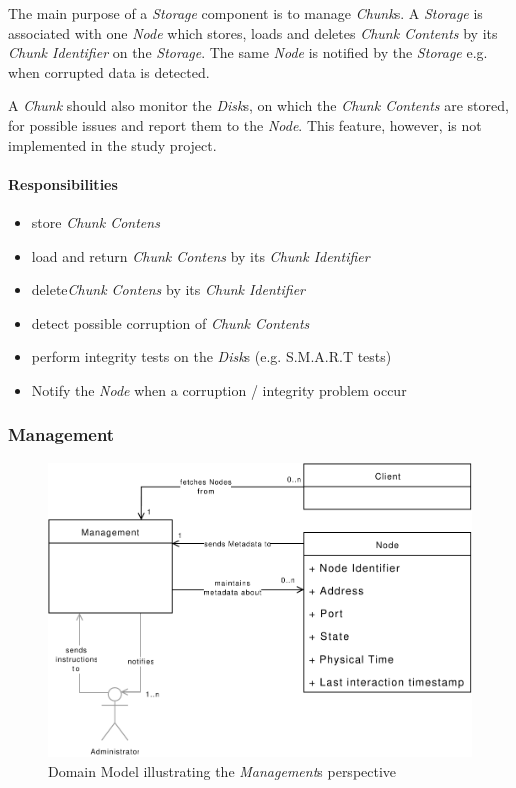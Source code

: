 The main purpose of a \emph{Storage} component is to manage \emph{Chunk}s.
A \emph{Storage} is associated with one \emph{Node} which stores, loads and deletes \emph{Chunk Contents} by its \emph{Chunk Identifier} on the \emph{Storage}. The same \emph{Node} is notified by the \emph{Storage} e.g. when corrupted data is detected.

A \emph{Chunk} should also monitor the \emph{Disk}s, on which the \emph{Chunk Contents} are stored, for possible issues and report them to the \emph{Node}. This feature, however, is not implemented in the study project.

\paragraph{Responsibilities}

\begin{itemize}
	\item store \emph{Chunk Contens}
	\item load and return \emph{Chunk Contens} by its \emph{Chunk Identifier}
	\item delete\emph{Chunk Contens} by its \emph{Chunk Identifier}
	\item detect possible corruption of \emph{Chunk Contents}
	\item perform integrity tests on the \emph{Disk}s (e.g. S.M.A.R.T tests)
	\item Notify the \emph{Node} when a corruption / integrity problem occur
\end{itemize}

\subsubsection{Management}

\begin{figure}[h]
    \centering
    \includegraphics[width=0.75\linewidth]{resources/management_domain_model}
    \caption[Management Domain Model]{Domain Model illustrating the \emph{Management}s perspective}
\end{figure}

